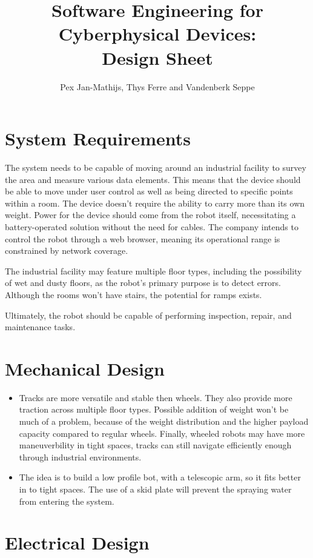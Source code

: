 \documentclass[a4paper]{article}
\title{Software Engineering for Cyberphysical Devices: \\ Design Sheet}
\author{Pex Jan-Mathijs, Thys Ferre and Vandenberk Seppe}
\date{}
\begin{document}
\maketitle

\section*{System Requirements}

The system needs to be capable of moving around an industrial facility to survey the area and measure various data elements. This means that the device should be able to move under user control as well as being directed to specific points within a room. The device doesn't require the ability to carry more than its own weight. Power for the device should come from the robot itself, necessitating a battery-operated solution without the need for cables. The company intends to control the robot through a web browser, meaning its operational range is constrained by network coverage.

The industrial facility may feature multiple floor types, including the possibility of wet and dusty floors, as the robot's primary purpose is to detect errors. Although the rooms won't have stairs, the potential for ramps exists.

Ultimately, the robot should be capable of performing inspection, repair, and maintenance tasks.

\section*{Mechanical Design}

\begin{itemize}
\item Tracks are more versatile and stable then wheels. They also provide more traction across multiple floor types. Possible addition of weight won't be much of a problem, because of the weight distribution and the higher payload capacity compared to regular wheels. Finally, wheeled robots may have more maneuverbility in tight spaces, tracks can still navigate efficiently enough through industrial environments. 
\item The idea is to build a low profile bot, with a telescopic arm, so it fits better in to tight spaces. The use of a skid plate will prevent the spraying water from entering the system.
\end{itemize}

\section*{Electrical Design}
\end{document}
